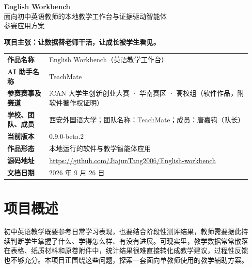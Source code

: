 \documentclass[11pt,a4paper,fontset=none]{ctexart}
\begin{document}
\begin{center}
{\LARGE\bfseries\color{ink} English Workbench}\\[3pt]
{\large 面向初中英语教师的本地教学工作台与证据驱动智能体}\\[5pt]
{\normalsize\color{muted} 参赛应用方案}
\end{center}

\vspace{2pt}
\begin{center}
\setlength{\fboxsep}{8pt}%
\colorbox{soft}{\parbox{0.9\textwidth}{\centering\bfseries\color{ink}
项目主张：让数据替老师干活，让成长被学生看见。}}
\end{center}
\vspace{4pt}

\begin{center}
\begin{tabularx}{\textwidth}{@{}L{3.1cm}Y@{}}
\toprule
\textbf{作品名称} & English Workbench（英语教学工作台） \\
\textbf{AI 助手名称} & TeachMate \\
\textbf{参赛赛事及赛道} & iCAN 大学生创新创业大赛 · 华南赛区 · 高校组（软件作品，附软件著作权证明） \\
\textbf{学校、团队、成员} & 西安外国语大学；团队名称：TeachMate；成员：唐嘉钧（队长） \\
\textbf{当前版本} & 0.9.0-beta.2 \\
\textbf{作品形态} & 本地运行的软件与教学智能体应用 \\
\textbf{源码地址} & \url{https://github.com/JiajunTang2006/English-workbench} \\
\textbf{文档日期} & 2026 年 9 月 26 日 \\
\bottomrule
\end{tabularx}
\end{center}

\vspace{2pt}
{\small\tableofcontents}

\clearpage

\section*{项目概述}

初中英语教学既要参考日常学习表现，也要结合阶段性测评结果，教师需要据此持续判断学生掌握了什么、学得怎么样、有没有进展。可现实里，教学数据常常散落在表格、纸质材料和原卷附件中，统计结果很难直接转化成教学建议，过程性反馈也不够充分。本项目正围绕这些问题，探索一套面向单教师使用的教学辅助方案。
\end{document}
